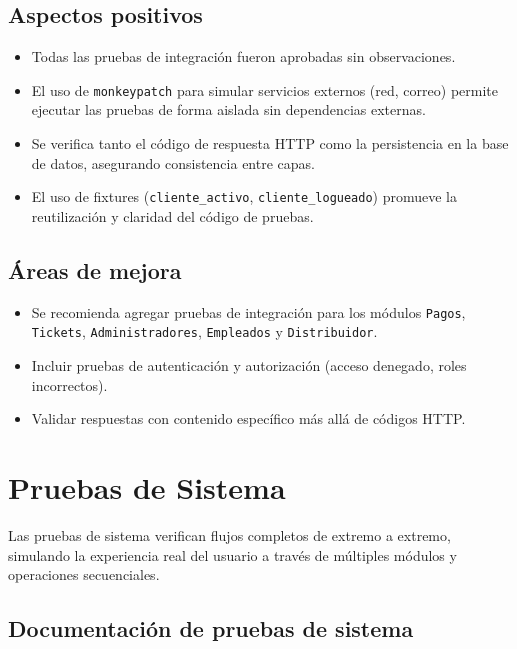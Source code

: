 \documentclass[12pt,a4paper]{article}
\begin{document}
\subsection{Aspectos positivos}

\begin{itemize}
  \item Todas las pruebas de integración fueron aprobadas sin observaciones.
  \item El uso de \texttt{monkeypatch} para simular servicios externos (red, correo) permite
        ejecutar las pruebas de forma aislada sin dependencias externas.
  \item Se verifica tanto el código de respuesta HTTP como la persistencia en la base de datos,
        asegurando consistencia entre capas.
  \item El uso de fixtures (\texttt{cliente\_activo}, \texttt{cliente\_logueado}) promueve
        la reutilización y claridad del código de pruebas.
\end{itemize}

\subsection{Áreas de mejora}

\begin{itemize}
  \item Se recomienda agregar pruebas de integración para los módulos \texttt{Pagos},
        \texttt{Tickets}, \texttt{Administradores}, \texttt{Empleados} y \texttt{Distribuidor}.
  \item Incluir pruebas de autenticación y autorización (acceso denegado, roles incorrectos).
  \item Validar respuestas con contenido específico más allá de códigos HTTP.
\end{itemize}

\newpage
\section{Pruebas de Sistema}

Las pruebas de sistema verifican flujos completos de extremo a extremo, simulando
la experiencia real del usuario a través de múltiples módulos y operaciones secuenciales.

\subsection{Documentación de pruebas de sistema}
\end{document}
